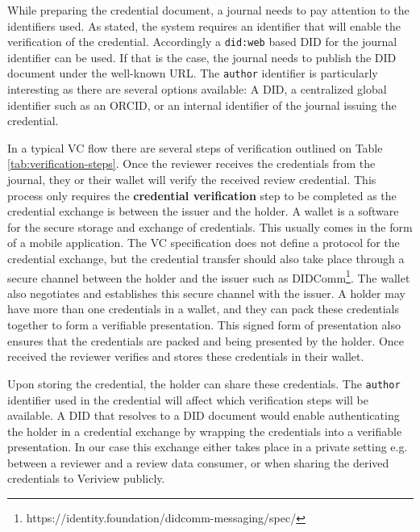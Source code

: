 While preparing the credential document, a journal needs to pay attention to the identifiers used. As stated, the system requires an identifier that will enable the verification of the credential. Accordingly a \lstinline{did:web} based \acrshort{DID} for the journal identifier can be used. If that is the case, the journal needs to publish the \acrshort{DID} document under the well-known \acrshort{URL}. The \lstinline{author} identifier is particularly interesting as there are several options available: A \acrfull{DID}, a centralized global identifier such as an \acrshort{ORCID}, or an internal identifier of the journal issuing the credential.

In a typical \acrshort{VC} flow there are several steps of verification outlined on Table \ref{tab:verification-steps}. Once the reviewer receives the credentials from the journal, they or their wallet will verify the received review credential. This process only requires the \textbf{credential verification} step to be completed as the credential exchange is between the issuer and the holder. A wallet is a software for the secure storage and exchange of credentials. This usually comes in the form of a mobile application. The VC specification does not define a protocol for the credential exchange, but the credential transfer should also take place through a secure channel between the holder and the issuer such as DIDComm\footnote{https://identity.foundation/didcomm-messaging/spec/}. The wallet also negotiates and establishes this secure channel with the issuer. A holder may have more than one credentials in a wallet, and they can pack these credentials together to form a verifiable presentation. This signed form of presentation also ensures that the credentials are packed and being presented by the holder. Once received the reviewer verifies and stores these credentials in their wallet. 





Upon storing the credential, the holder can share these credentials. The \lstinline{author} identifier used in the credential will affect which verification steps will be available. A \acrshort{DID} that resolves to a \acrshort{DID} document would enable authenticating the holder in a credential exchange by wrapping the credentials into a verifiable presentation. In our case this exchange either takes place in a private setting e.g. between a reviewer and a review data consumer, or when sharing the derived credentials to Veriview publicly. 



